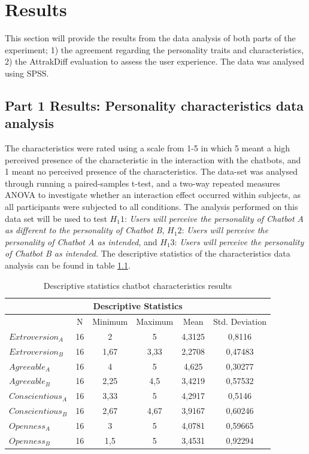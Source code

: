 \chapter{Results}
\label{chap:results}

This section will provide the results from the data analysis of both parts of the experiment; 1) the agreement regarding the personality traits and characteristics, 2) the AttrakDiff evaluation to assess the user experience. The data was analysed using SPSS.

\section{Part 1 Results: Personality characteristics data analysis}

The characteristics were rated using a scale from 1-5 in which 5 meant a high perceived presence of the characteristic in the interaction with the chatbots, and 1 meant no perceived presence of the characteristics. The data-set was analysed through running a paired-samples t-test, and a two-way repeated measures ANOVA to investigate whether an interaction effect occurred within subjects, as all participants were subjected to all conditions. The analysis performed on this data set will be used to test $H_1 1$: \textit{Users will perceive the personality of Chatbot A as different to the personality of Chatbot B}, $H_1 2$: \textit{Users will perceive the personality of Chatbot A as intended}, and $H_1 3$: \textit{Users will perceive the personality of Chatbot B as intended}. The descriptive statistics of the characteristics data analysis can be found in table \ref{table:5}.

\begin{table}[h]
\centering
\begin{tabular}{lccccc}
\hline
\multicolumn{6}{c}{\textbf{Descriptive Statistics}} \\
\hline
& N & Minimum & Maximum & Mean & Std. Deviation \\
$Extroversion_A$ & 16 & 2 & 5 & 4,3125 & 0,8116 \\
$Extroversion_B$ & 16 & 1,67 & 3,33 & 2,2708 & 0,47483 \\
$Agreeable_A$ & 16 & 4 & 5 & 4,625 & 0,30277 \\
$Agreeable_B$ & 16 & 2,25 & 4,5 & 3,4219 & 0,57532 \\
$Conscientious_A$ & 16 & 3,33 & 5 & 4,2917 & 0,5146 \\
$Conscientious_B$ & 16 & 2,67 & 4,67 & 3,9167 & 0,60246 \\
$Openness_A$ & 16 & 3 & 5 & 4,0781 & 0,59665 \\
$Openness_B$ & 16 & 1,5 & 5 & 3,4531 & 0,92294 \\
\end{tabular}
 \caption{Descriptive statistics chatbot characteristics results}
 \label{table:5}
    \end{table}

